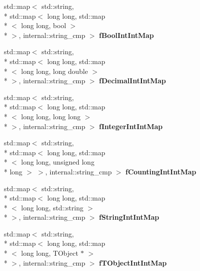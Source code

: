 \begin{DoxyCompactItemize}
\item 
\hypertarget{class_h_a_l_1_1_analysis_data_a4d6c6e21427e94fe1a53f524cf0fbbc5}{std\+::map$<$ std\+::string, \\*
std\+::map$<$ long long, std\+::map\\*
$<$ long long, bool $>$\\*
 $>$, internal\+::string\+\_\+cmp $>$ {\bfseries f\+Bool\+Int\+Int\+Map}}\label{class_h_a_l_1_1_analysis_data_a4d6c6e21427e94fe1a53f524cf0fbbc5}

\item 
\hypertarget{class_h_a_l_1_1_analysis_data_a48a5faced1a93d3f912b95314b0eb9f2}{std\+::map$<$ std\+::string, \\*
std\+::map$<$ long long, std\+::map\\*
$<$ long long, long double $>$\\*
 $>$, internal\+::string\+\_\+cmp $>$ {\bfseries f\+Decimal\+Int\+Int\+Map}}\label{class_h_a_l_1_1_analysis_data_a48a5faced1a93d3f912b95314b0eb9f2}

\item 
\hypertarget{class_h_a_l_1_1_analysis_data_ae0a0427f6204ac11136c141f56a8bb03}{std\+::map$<$ std\+::string, \\*
std\+::map$<$ long long, std\+::map\\*
$<$ long long, long long $>$\\*
 $>$, internal\+::string\+\_\+cmp $>$ {\bfseries f\+Integer\+Int\+Int\+Map}}\label{class_h_a_l_1_1_analysis_data_ae0a0427f6204ac11136c141f56a8bb03}

\item 
\hypertarget{class_h_a_l_1_1_analysis_data_ad50906057dfe2e1cda6756218f549201}{std\+::map$<$ std\+::string, \\*
std\+::map$<$ long long, std\+::map\\*
$<$ long long, unsigned long \\*
long $>$ $>$, internal\+::string\+\_\+cmp $>$ {\bfseries f\+Counting\+Int\+Int\+Map}}\label{class_h_a_l_1_1_analysis_data_ad50906057dfe2e1cda6756218f549201}

\item 
\hypertarget{class_h_a_l_1_1_analysis_data_ac06bbfebb1b319a3b17407c3a5bc17c2}{std\+::map$<$ std\+::string, \\*
std\+::map$<$ long long, std\+::map\\*
$<$ long long, std\+::string $>$\\*
 $>$, internal\+::string\+\_\+cmp $>$ {\bfseries f\+String\+Int\+Int\+Map}}\label{class_h_a_l_1_1_analysis_data_ac06bbfebb1b319a3b17407c3a5bc17c2}

\item 
\hypertarget{class_h_a_l_1_1_analysis_data_ac743254719039aa3af1d33b6a2558499}{std\+::map$<$ std\+::string, \\*
std\+::map$<$ long long, std\+::map\\*
$<$ long long, T\+Object $\ast$ $>$\\*
 $>$, internal\+::string\+\_\+cmp $>$ {\bfseries f\+T\+Object\+Int\+Int\+Map}}\label{class_h_a_l_1_1_analysis_data_ac743254719039aa3af1d33b6a2558499}

\end{DoxyCompactItemize}


